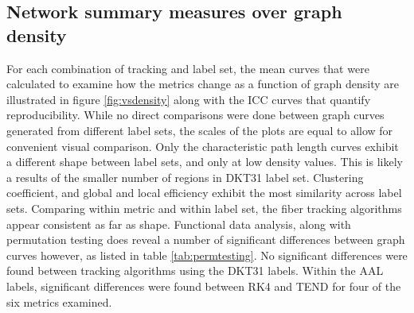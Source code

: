 \documentclass{frontiersSCNS} %
\begin{document}
\subsection{Network summary measures over graph density}
For each combination of tracking and label set, the mean curves that were calculated to examine how the metrics change as a 
function of graph density are illustrated in figure \ref{fig:vsdensity} along with the ICC curves that quantify reproducibility. While
no direct comparisons were done between graph curves generated from different label sets, the scales of the plots are equal to 
allow for convenient visual comparison. Only the characteristic path length curves exhibit a different shape between label sets, and
only at low density values. This is likely a results of the smaller number of regions in DKT31 label set. Clustering coefficient, and
global and local efficiency exhibit the most similarity across label sets. Comparing within metric and within label set, the fiber tracking
algorithms appear consistent as far as shape. Functional data analysis, along with permutation testing does reveal a number of significant
differences between graph curves however, as listed in table \ref{tab:permtesting}. No significant differences were found between 
tracking algorithms using the DKT31 labels. Within the AAL labels, significant differences were found between RK4 and TEND for four 
of the six metrics examined.
\end{document}
